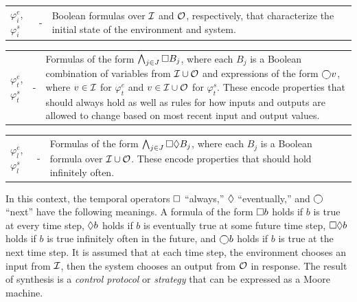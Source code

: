 \documentclass[runningheads]{llncs}
\begin{document}
\vspace{0.5em}

\noindent \begin{xtabular}{p{.045\columnwidth}p{.015\columnwidth}p{.860\columnwidth}}
 $\varphi^e_i$, $\varphi^s_i$ & - & Boolean formulas over $\mathcal{I}$ and $\mathcal{O}$, respectively, that characterize the initial state of the environment and system.
\end{xtabular}

\vspace{0.5em}

\noindent \begin{xtabular}{p{.045\columnwidth}p{.015\columnwidth}p{.860\columnwidth}}
 $\varphi^e_t$, $\varphi^s_t$ & - &  Formulas of the form $\bigwedge_{j \in J} \square B_j$, where each $B_j$ is a Boolean combination of variables from $\mathcal{I} \cup \mathcal{O}$ and expressions of the form $\varbigcirc v$, where $v \in \mathcal{I}$ for $\varphi^e_t$ and $v \in \mathcal{I} \cup \mathcal{O}$ for $\varphi^s_t$. These encode properties that should always hold as well as rules for how inputs and outputs are allowed to change based on most recent input and output values.
\end{xtabular}

\vspace{0.5em}

\noindent \begin{xtabular}{p{.045\columnwidth}p{.015\columnwidth}p{.860\columnwidth}}
$\varphi^e_l$, $\varphi^s_l$ & - & Formulas of the form $\bigwedge_{j \in J} \square \lozenge B_j$, where each $B_j$ is a Boolean formula over $\mathcal{I} \cup \mathcal{O}$. These encode properties that should hold infinitely often.
\end{xtabular}

\vspace{0.5em}

\noindent 
In this context, the temporal operators $\square$ ``always,'' $\lozenge$ ``eventually,'' and $\varbigcirc$  ``next'' have the following meanings. 
A formula of the form $\square b$ holds if $b$ is true at every time step, 
$\lozenge b$ holds if $b$ is eventually true at some future time step, 
$\square \lozenge b$ holds if $b$ is true infinitely often in the future, 
and $\varbigcirc b$ holds if $b$ is true at the next time step. 
It is assumed that at each time step, the environment chooses an input from $\mathcal{I}$, then the system chooses an output from $\mathcal{O}$ in response. 
The result of synthesis is a \emph{control protocol} or \emph{strategy} that can be expressed as a Moore machine. 
\end{document}
